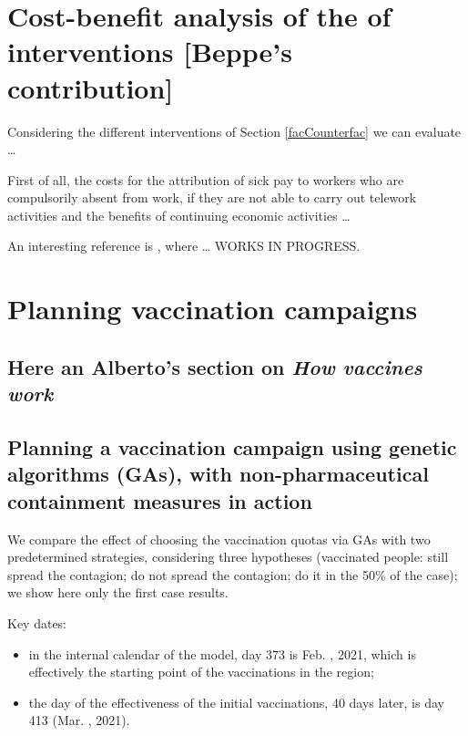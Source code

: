 \documentclass[graybox]{svmult}
\begin{document}
\section{Cost-benefit analysis of the of interventions [Beppe's contribution]}
\label{CBanalysis}

Considering the different interventions of Section \ref{facCounterfac} we can evaluate \ldots

First of all, the costs for the attribution of sick pay to workers who are compulsorily absent from work, if they are not able to carry out telework activities and the benefits of continuing economic activities \ldots

An interesting reference is \cite{doi:10.1111/ijcp.13674}, where \ldots 
WORKS IN PROGRESS.



\section{Planning vaccination campaigns}
\label{planning}

\subsection{Here an Alberto's section on \emph{How vaccines work}}
\label{vaccineAction}

\subsection{Planning a vaccination campaign using genetic algorithms (GAs), with non-pharmaceutical containment measures in action}
\label{planGA}

We compare the effect of choosing the vaccination quotas via GAs with two predetermined strategies, considering three hypotheses (vaccinated people: still spread the contagion; do not spread the contagion; do it in the 50\% of the case); we show here only the first case results.

Key dates: 
\begin{itemize}
\item in the internal calendar of the model, day 373 is Feb. , 2021, which is effectively the starting point of the vaccinations in the region; 

\item the day of the effectiveness of the initial vaccinations, 40 days later, is day 413 (Mar. , 2021).
\end{itemize}
\end{document}
